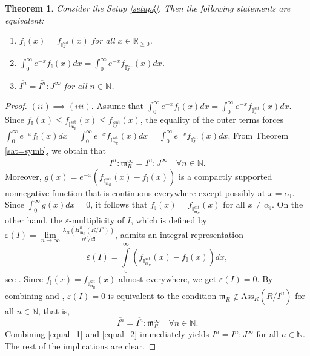 \documentclass[12pt,a4paper]{amsart}
\theoremstyle{plain}
\newtheorem{theorem}{Theorem}[section]
\theoremstyle{definition}
\numberwithin{equation}{theorem}
\begin{document}
\begin{theorem}\label{adic=symb}
 Consider the Setup \ref{setup4}. Then the following statements are equivalent:
 \begin{enumerate}[$(i)$]
  \item $\displaystyle f_{\mathbb{I}}(x) = f_{\mathbb{I}^{\mathrm{sat}}_J}(x)$ for all $x\in\mathbb{R}_{\geq 0}$.
  \item $\displaystyle \int_0^{\infty}e^{-x}f_{\mathbb{I}}(x) dx = \int_0^{\infty}e^{-x}f_{\mathbb{I}^{\mathrm{sat}}_J}(x) dx$.
  \item $\displaystyle \overline{I^n} = \overline{I^n} \colon J^{\infty}$ for all $n\in\mathbb{N}$.
 \end{enumerate}
\end{theorem}
\begin{proof}
 $(ii)\implies (iii)$. Assume that $\int_0^{\infty}e^{-x}f_{\mathbb{I}}(x) dx = \int_0^{\infty}e^{-x}f_{\mathbb{I}^{\mathrm{sat}}_J}(x) dx$. Since $f_{\mathbb{I}}(x) \leq f_{\mathbb{I}^{\mathrm{sat}}_{\mathfrak{m}_R}}(x) \leq f_{\mathbb{I}^{\mathrm{sat}}_J}(x)$, the equality of the outer terms forces $\int_0^{\infty}e^{-x}f_{\mathbb{I}}(x) dx = \int_0^{\infty}e^{-x}f_{\mathbb{I}^{\mathrm{sat}}_{\mathfrak{m}_R}}(x)dx = \int_0^{\infty}e^{-x}f_{\mathbb{I}^{\mathrm{sat}}_J}(x) dx$. From Theorem \ref{sat=symb}, we obtain that
 \begin{equation}\label{equal_1}
  \overline{I^n} : \mathfrak{m}_R^{\infty} = \overline{I^n} : J^{\infty} \quad \forall n\in\mathbb{N}.
 \end{equation}
Moreover, $g(x)= e^{-x}\left(f_{\mathbb{I}^{\mathrm{sat}}_{\mathfrak{m}_R}}(x) - f_{\mathbb{I}}(x)\right)$ is a compactly supported nonnegative function that is continuous everywhere except possibly at $x=\alpha_{\mathbb{I}}$. Since $\int_0^{\infty}g(x)dx = 0$, it follows that $f_{\mathbb{I}}(x) = f_{\mathbb{I}^{\mathrm{sat}}_{\mathfrak{m}_R}}(x)$ for all $x\neq\alpha_{\mathbb{I}}$. On the other hand, the $\varepsilon$-multiplicity of $I$, which is defined by $\varepsilon(I) = \lim\limits_{n\to\infty}\frac{\lambda_R\left(H^0_{\mathfrak{m}_R}\left(R/I^n\right)\right)}{n^d/d!}$, admits an integral representation $$\varepsilon(I) = \int\limits_0^{\infty} \left(f_{\mathbb{I}^{\mathrm{sat}}_{\mathfrak{m}_R}}(x) - f_{\mathbb{I}}(x)\right)dx,$$ see \cite[Theorem 5.19]{DRT25}. Since $f_{\mathbb{I}}(x) = f_{\mathbb{I}^{\mathrm{sat}}_{\mathfrak{m}_R}}(x)$ almost everywhere, we get $\varepsilon(I)=0$. By combining \cite[Theorem 4.7]{KV10} and \cite[Theorem 5.4.6]{HS06}, $\varepsilon(I)=0$ is equivalent to the condition $\mathfrak{m}_R \not\in \mathrm{Ass}_R\left(R/\overline{I^n}\right)$ for all $n\in\mathbb{N}$, that is,
 \begin{equation}\label{equal_2}
  \overline{I^n} = \overline{I^n} \colon \mathfrak{m}_R^{\infty} \quad \forall n\in\mathbb{N}.
 \end{equation}
Combining \eqref{equal_1} and \eqref{equal_2} immediately yields $\overline{I^n} = \overline{I^n} \colon J^{\infty}$ for all $n\in\mathbb{N}$. The rest of the implications are clear.
\end{proof}
\end{document}
